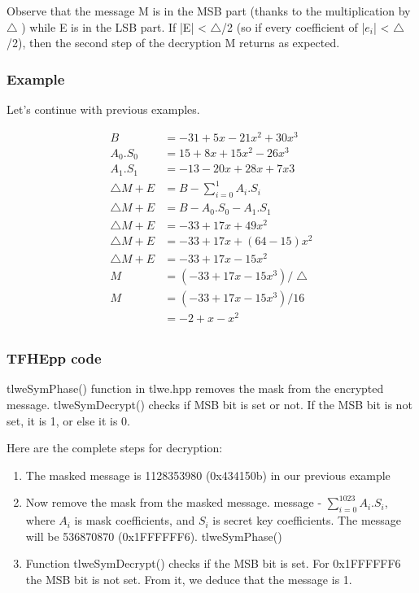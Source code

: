 \documentclass{techrep}
\theoremstyle{definition}
\theoremstyle{plain}
\begin{document}
Observe that the message M is in the MSB part (thanks to the multiplication by $\bigtriangleup$ ) while E is in the LSB part. If |E| <  $\bigtriangleup$/2 (so if every coefficient of |$e_i$| < $\bigtriangleup$/2), then the second step of the decryption M returns as expected. 

\subsubsection{Example}
Let’s continue with previous examples. 

	\begin{align*}
            B &= -31 + 5x - 21x^2 + 30x^3 \\
            A_0.S_0 &= 15 + 8x + 15x^2 -26x^3 \\
            A_1.S_1 &=  -13-20x+28x+7x3 \\
		\bigtriangleup M + E  &= B  - \sum_{i=0}^{1}A_i . S_i  \\
            \bigtriangleup M + E  &= B  - A_0.S_0 - A_1.S_1 \\
            \bigtriangleup M + E &= -33 + 17x + 49x^2 \\
             \bigtriangleup M + E &= -33 + 17x + (64- 15)x^2 \\
            \bigtriangleup M + E &= -33 + 17x - 15x^2 \\
            M &= (-33 + 17x - 15x^3)/ \bigtriangleup \\
            M &= (-33 + 17x - 15x^3)/ 16 \\
                &= -2 + x -x^2 \\
	\end{align*}

 \subsubsection{TFHEpp code}
tlweSymPhase() function in tlwe.hpp removes the mask from the encrypted message.  tlweSymDecrypt() checks if MSB bit is set or not. If the MSB bit is not set, it is 1, or else it is 0. 


Here are the complete steps for decryption:
\begin{enumerate}
  \item The masked message is 1128353980 (0x434150b) in our previous example
  \item Now remove the mask from the masked message.  message - $\sum_{i=0}^{1023}A_i . S_i$, where $A_i$ is mask coefficients, and $S_i$ is secret key coefficients.  The message will be 536870870 (0x1FFFFFF6). tlweSymPhase()
   \item Function tlweSymDecrypt() checks if the MSB bit is set. For 0x1FFFFFF6 the MSB bit is not set. From it, we deduce that the message is 1.
\end{enumerate}
\end{document}
